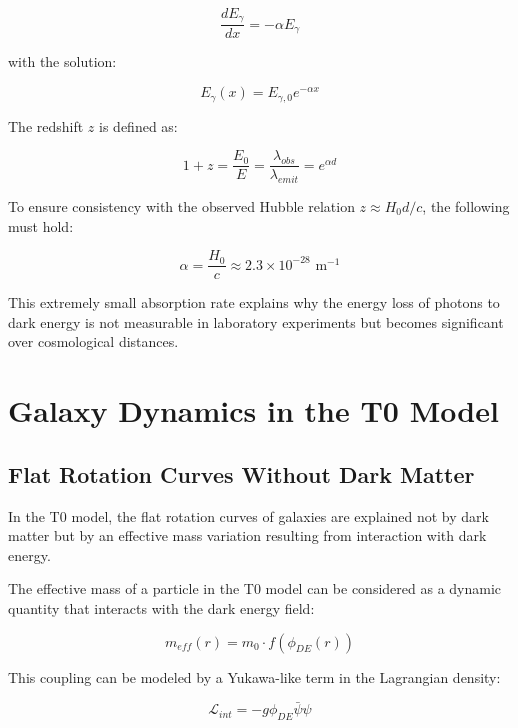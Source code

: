 \documentclass[a4paper,12pt]{article}
\begin{document}
	\begin{equation}
		\frac{dE_{\gamma}}{dx} = -\alpha E_{\gamma}
	\end{equation}
	
	with the solution:
	
	\begin{equation}
		E_{\gamma}(x) = E_{\gamma,0} e^{-\alpha x}
	\end{equation}
	
	The redshift $z$ is defined as:
	
	\begin{equation}
		1 + z = \frac{E_0}{E} = \frac{\lambda_{obs}}{\lambda_{emit}} = e^{\alpha d}
	\end{equation}
	
	To ensure consistency with the observed Hubble relation $z \approx H_0 d/c$, the following must hold:
	
	\begin{equation}
		\alpha = \frac{H_0}{c} \approx 2.3 \times 10^{-28} \text{ m}^{-1}
	\end{equation}
	
	This extremely small absorption rate explains why the energy loss of photons to dark energy is not measurable in laboratory experiments but becomes significant over cosmological distances.
	
	\section{Galaxy Dynamics in the T0 Model}
	
	\subsection{Flat Rotation Curves Without Dark Matter}
	
	In the T0 model, the flat rotation curves of galaxies are explained not by dark matter but by an effective mass variation resulting from interaction with dark energy. 
	
	The effective mass of a particle in the T0 model can be considered as a dynamic quantity that interacts with the dark energy field:
	
	\begin{equation}
		m_{eff}(r) = m_0 \cdot f(\phi_{DE}(r))
	\end{equation}
	
	This coupling can be modeled by a Yukawa-like term in the Lagrangian density:
	
	\begin{equation}
		\mathcal{L}_{int} = -g \phi_{DE} \bar{\psi}\psi
	\end{equation}
	
\end{document}
